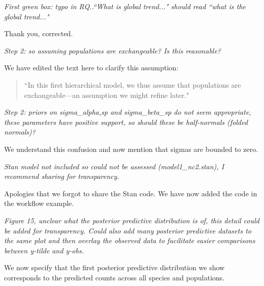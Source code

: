 \documentclass[11pt,letter]{article}
\begin{document}
\begin{mybox}
\emph{First green box: typo in RQ..``What is global trend..." should read
``what is the global trend..."}
\end{mybox}

Thank you, corrected.

\begin{mybox}
\emph{Step 2: so assuming populations are exchangeable? Is this reasonable?}
\end{mybox}

We have edited the text here to clarify this assumption:
\begin{quote}
``In this first hierarchical model, we thus assume that populations are exchangeable---an assumption we might refine later."
\end{quote}


\begin{mybox}
\emph{Step 2: priors on sigma\_alpha,sp and sigma\_beta\_sp do not seem
appropriate, these parameters have positive support, so should these be
half-normals (folded normals)?}
\end{mybox}

We understand this confusion and now mention that sigmas are bounded to zero.

\begin{mybox}
\emph{Stan model not included so could not be assessed (model1\_nc2.stan), I
recommend sharing for transparency.}
\end{mybox}

Apologies that we forgot to share the Stan code. We have now added the code in the workflow example.

\begin{mybox}
\emph{Figure 15, unclear what the posterior predictive distribution is of,
this detail could be added for transparency. Could also add many
posterior predictive datasets to the same plot and then overlay the
observed data to facilitate easier comparisons between y-tilde and y-obs.}
\end{mybox}

We now specify that the first posterior predictive distribution we show corresponds to the predicted counts across all species and populations.
\end{document}
